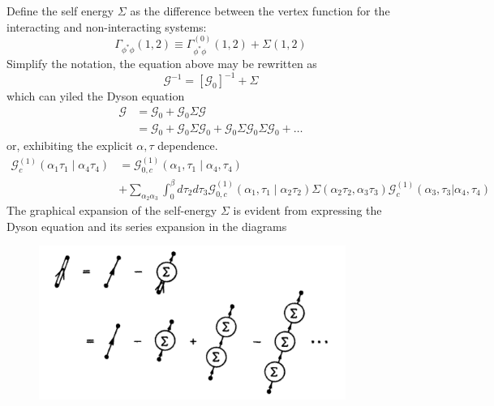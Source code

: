 \documentclass[12pt]{article}
\begin{document}
Define the self energy $\Sigma$ as the difference between the vertex function for 
the interacting and non-interacting systems:
\begin{equation*}
    \Gamma_{\phi^*\phi}(1,2)\equiv\Gamma^{(0)}_{\phi^*\phi}(1,2)+\Sigma(1,2)
\end{equation*}
Simplify the notation, the equation above may be rewritten as 
\begin{equation*}
    \mathcal{G}^{-1}=[\mathcal{G}_0]^{-1}+\Sigma
\end{equation*}
which can yiled the Dyson equation
\begin{equation*}
    \begin{split}
        \mathcal{G}&=\mathcal{G}_0+\mathcal{G}_0\Sigma\mathcal{G}\\
        &=\mathcal{G}_0+\mathcal{G}_0\Sigma\mathcal{G}_0+\mathcal{G}_0
        \Sigma\mathcal{G}_0\Sigma\mathcal{G}_0+\dots  
    \end{split}
\end{equation*}
or, exhibiting the explicit ${\alpha,\tau}$ dependence.
\begin{equation*}
    \begin{aligned}
        \mathcal{G}_{c}^{(1)}\left(\alpha_{1}\tau_{1}\mid \alpha_{4}\tau_{4}
        \right)&=\mathcal{G}_{0, c}^{(1)}\left(\alpha_{1},\tau_{1}\mid\alpha_{4},
        \tau_{4}\right) \\
        &+\sum_{\alpha_{2}\alpha_{3}}\int_{0}^{\beta}d\tau_{2}d\tau_{3}
        \mathcal{G}_{0, c}^{(1)}\left(\alpha_{1},\tau_{1}\mid\alpha_{2}\tau_{2}
        \right)\Sigma\left(\alpha_{2}\tau_{2},\alpha_{3}\tau_{3}\right)
        \mathcal{G}_c^{(1)}(\alpha_3,\tau_3|\alpha_4,\tau_4)
        \end{aligned}
\end{equation*}
The graphical expansion of the self-energy $\Sigma$ is evident from expressing 
the Dyson equation and its series expansion in the diagrams
\begin{figure}[H]
    \centering
    \includegraphics[width=10cm]{p17.png}
    \caption*{}
    \label{}
\end{figure}
\end{document}
